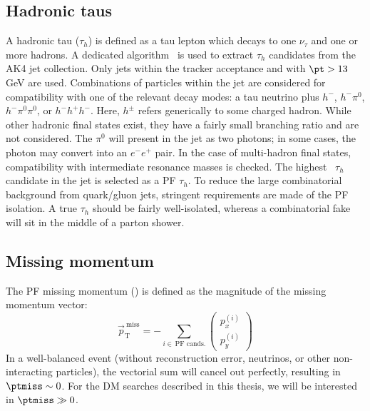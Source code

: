 \subsection{Hadronic taus}

A hadronic tau ($\tau_h$) is defined as a tau lepton which decays to one $\nu_\tau$ and one or more hadrons.
A dedicated algorithm~\cite{cmspf,tauid} is used to extract $\tau_h$ candidates from the AK4 jet collection.
Only jets within the tracker acceptance and with $\pt>13$ GeV are used.
Combinations of particles within the jet are considered for compatibility with one of the relevant decay modes: a tau neutrino plus $h^-$, $h^-\pi^0$, $h^-\pi^0\pi^0$, or $h^-h^+h^-$.
Here, $h^\pm$ refers generically to some charged hadron.
While other hadronic final states exist, they have a fairly small branching ratio and are not considered.
The $\pi^0$ will present in the jet as two photons; in some cases, the photon may convert into an $e^-e^+$ pair. 
In the case of multi-hadron final states, compatibility with intermediate resonance masses is checked.
The highest \pt~$\tau_h$ candidate in the jet is selected as a PF $\tau_h$.
To reduce the large combinatorial background from quark/gluon jets, stringent requirements are made of the PF isolation.
A true $\tau_h$ should be fairly well-isolated, whereas a combinatorial fake will sit in the middle of a parton shower. 

\subsection{Missing momentum}
\label{sec:cms:met}

The PF missing momentum (\ptmiss) is defined as the magnitude of the missing momentum vector:
\begin{equation}
	\vec{p}_\mathrm{T}^\mathrm{~miss} = -\sum_{i\in\,\text{PF cands.}} \left(\begin{matrix} p_x^{(i)} \\ p_y^{(i)} \end{matrix}\right)
\end{equation}
In a well-balanced event (without reconstruction error, neutrinos, or other non-interacting particles), the vectorial sum will cancel out perfectly, resulting in $\ptmiss\sim 0$. 
For the DM searches described in this thesis, we will be interested in $\ptmiss \gg 0$.

